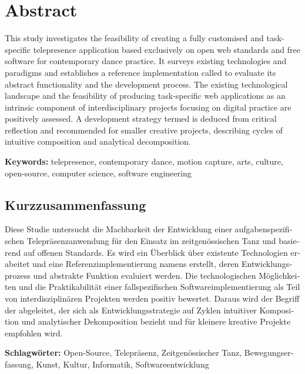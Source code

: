 \section*{Abstract}

This study investigates the feasibility of creating a fully customised and task-specific telepresence application based exclusively on open web standards and free software for contemporary dance practice.
It surveys existing technologies and paradigms and establishes a reference implementation called  to evaluate its abstract functionality and the development process.
The existing technological landscape and the feasibility of producing task-specific web applications as an intrinsic component of interdisciplinary projects focusing on digital practice are positively assessed.
A development strategy termed  is deduced from critical reflection and recommended for smaller creative projects, describing cycles of intuitive composition and analytical decomposition.

\textbf{Keywords:} telepresence, contemporary dance, motion capture, arts, culture, open-source, computer science, software engineering


\begin{otherlanguage}{ngerman}
\section*{Kurzzusammenfassung}
Diese Studie untersucht die Machbarkeit der Entwicklung einer aufgabenspezifischen Telepräsenzanwendung für den Einsatz im zeitgenössischen Tanz und basierend auf offenen Standards.
Es wird ein Überblick über existente Technologien erabeitet und eine Referenzimplementierung namens  erstellt, deren Entwicklungsprozess und abstrakte Funktion evaluiert werden.
Die technologischen Möglichkeiten und die Praktikabilität einer fallspezifischen Softwareimplementierung als Teil von interdisziplinären Projekten werden positiv bewertet.
Daraus wird der Begriff der  abgeleitet, der sich als Entwicklungsstrategie auf Zyklen intuitiver Komposition und analytischer Dekomposition bezieht und für kleinere kreative Projekte empfohlen wird.
 
\textbf{Schlagwörter:} Open-Source, Telepräsenz, Zeitgenössischer Tanz, Bewegungserfassung, Kunst, Kultur, Informatik, Softwareentwicklung
\end{otherlanguage}